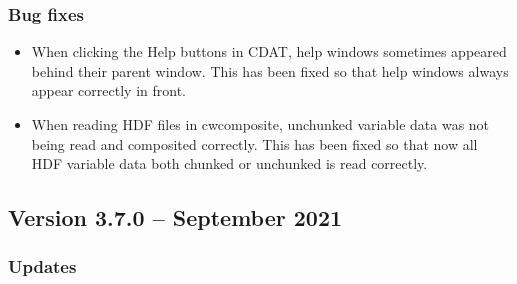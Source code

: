\subsubsection*{ Bug fixes}
\begin{itemize}

  \item When clicking the Help buttons in CDAT, help windows sometimes 
  appeared behind their parent window.  This has been fixed so that help
  windows always appear correctly in front.

  \item When reading HDF files in cwcomposite, unchunked variable data was 
  not being read and composited correctly.  This has been fixed so that now all
  HDF variable data both chunked or unchunked is read correctly.

\end{itemize}


\subsection*{Version 3.7.0 -- September 2021}

\subsubsection*{ Updates}


